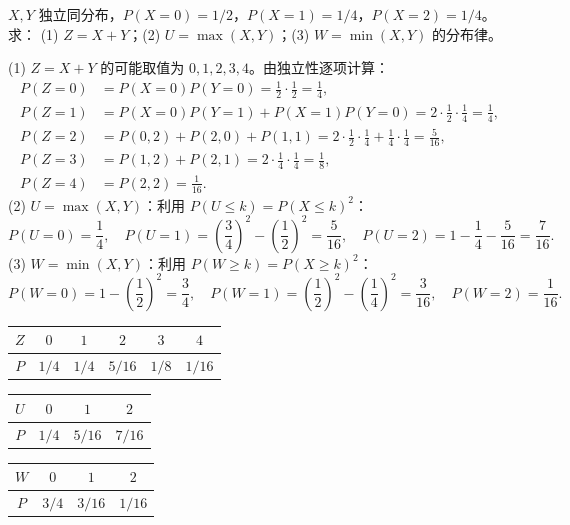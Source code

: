 ﻿\documentclass[lang=cn,11pt]{elegantbook}
\begin{document}
\begin{exercise} \label{exer:3-d3}
$X,Y$ 独立同分布，$P(X=0)=1/2$，$P(X=1)=1/4$，$P(X=2)=1/4$。求：
(1) $Z=X+Y$；(2) $U=\max(X,Y)$；(3) $W=\min(X,Y)$ 的分布律。
\end{exercise}
\begin{solution}
(1) $Z=X+Y$ 的可能取值为 $0,1,2,3,4$。由独立性逐项计算：
\begin{align*}
P(Z=0) &= P(X=0)P(Y=0) = \frac{1}{2}\cdot\frac{1}{2} = \frac{1}{4}, \\
P(Z=1) &= P(X=0)P(Y=1)+P(X=1)P(Y=0) = 2\cdot\frac{1}{2}\cdot\frac{1}{4} = \frac{1}{4}, \\
P(Z=2) &= P(0,2)+P(2,0)+P(1,1) = 2\cdot\frac{1}{2}\cdot\frac{1}{4}+\frac{1}{4}\cdot\frac{1}{4} = \frac{5}{16}, \\
P(Z=3) &= P(1,2)+P(2,1) = 2\cdot\frac{1}{4}\cdot\frac{1}{4} = \frac{1}{8}, \\
P(Z=4) &= P(2,2) = \frac{1}{16}.
\end{align*}
(2) $U=\max(X,Y)$：利用 $P(U \leqslant k) = P(X \leqslant k)^2$：
\[
P(U=0) = \frac{1}{4},\quad P(U=1) = \left(\frac{3}{4}\right)^2 - \left(\frac{1}{2}\right)^2 = \frac{5}{16},\quad P(U=2) = 1-\frac{1}{4}-\frac{5}{16} = \frac{7}{16}.
\]
(3) $W=\min(X,Y)$：利用 $P(W \geqslant k) = P(X \geqslant k)^2$：
\[
P(W=0) = 1-\left(\frac{1}{2}\right)^2 = \frac{3}{4},\quad P(W=1) = \left(\frac{1}{2}\right)^2-\left(\frac{1}{4}\right)^2 = \frac{3}{16},\quad P(W=2) = \frac{1}{16}.
\]
\begin{center}
\begin{tabular}{c|ccccc}
\toprule
$Z$ & $0$ & $1$ & $2$ & $3$ & $4$ \\
\midrule
$P$ & $1/4$ & $1/4$ & $5/16$ & $1/8$ & $1/16$ \\
\bottomrule
\end{tabular}
\quad
\begin{tabular}{c|ccc}
\toprule
$U$ & $0$ & $1$ & $2$ \\
\midrule
$P$ & $1/4$ & $5/16$ & $7/16$ \\
\bottomrule
\end{tabular}
\quad
\begin{tabular}{c|ccc}
\toprule
$W$ & $0$ & $1$ & $2$ \\
\midrule
$P$ & $3/4$ & $3/16$ & $1/16$ \\
\bottomrule
\end{tabular}
\end{center}
\end{solution}
\end{document}
